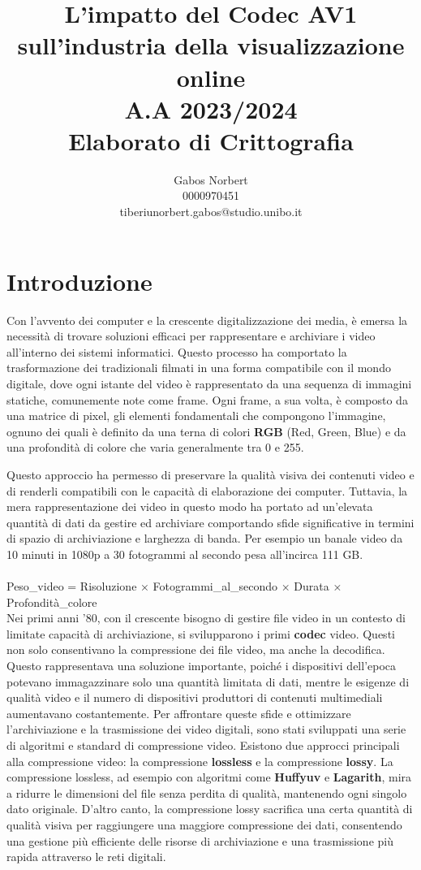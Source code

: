 \documentclass[a4paper,12pt, oneside]{article}
\title{\textbf{L'impatto del Codec AV1 sull'industria della visualizzazione online} \\ \large A.A 2023/2024 \\ Elaborato di Crittografia}
\author{Gabos Norbert \\ 0000970451 \\ tiberiunorbert.gabos@studio.unibo.it }
\date{}
\begin{document}
\maketitle

\newpage
\tableofcontents{}
\newpage

\section{Introduzione}
Con l'avvento dei computer e la crescente digitalizzazione dei media, è emersa la necessità di
trovare soluzioni efficaci per rappresentare e archiviare i video all'interno dei sistemi
informatici. Questo processo ha comportato la trasformazione dei tradizionali filmati in una
forma compatibile con il mondo digitale, dove ogni istante del video è rappresentato da una
sequenza di immagini statiche, comunemente note come frame. Ogni frame, a sua volta, è
composto da una matrice di pixel, gli elementi fondamentali che compongono l'immagine, ognuno
dei quali è definito da una terna di colori \textbf{RGB} (Red, Green, Blue) e da una profondità
di colore che varia generalmente tra 0 e 255.

Questo approccio ha permesso di preservare la qualità visiva dei contenuti video e di renderli
compatibili con le capacità di elaborazione dei computer. Tuttavia, la mera rappresentazione
dei video in questo modo ha portato ad un'elevata quantità di dati da gestire ed archiviare
comportando sfide significative in termini di spazio di archiviazione e larghezza di banda.
Per esempio un banale video da 10 minuti in 1080p a 30 fotogrammi al secondo pesa
all'incirca 111 GB.
\noindent
\\\\Peso\_video = Risoluzione × Fotogrammi\_al\_secondo × Durata × Profondità\_colore\\

Nei primi anni '80, con il crescente bisogno di gestire file video in un contesto di limitate
capacità di archiviazione, si svilupparono i primi \textbf{codec} video. Questi non solo consentivano
la compressione dei file video, ma anche la decodifica. Questo rappresentava una soluzione
importante, poiché i dispositivi dell'epoca potevano immagazzinare solo una quantità limitata
di dati, mentre le esigenze di qualità video e il numero di dispositivi produttori di contenuti
multimediali aumentavano costantemente.
Per affrontare queste sfide e ottimizzare l'archiviazione e la trasmissione dei video
digitali, sono stati sviluppati una serie di algoritmi e standard di compressione video.
Esistono due approcci principali alla compressione video: la compressione \textbf{lossless} e
la compressione \textbf{lossy}. La compressione lossless, ad esempio con algoritmi come
\textbf{Huffyuv} e \textbf{Lagarith}, mira a ridurre le dimensioni del file senza perdita di
qualità, mantenendo ogni singolo dato originale. D'altro canto, la compressione lossy
sacrifica una certa quantità di qualità visiva per raggiungere una maggiore compressione dei
dati, consentendo una gestione più efficiente delle risorse di archiviazione e una
trasmissione più rapida attraverso le reti digitali.
\end{document}
